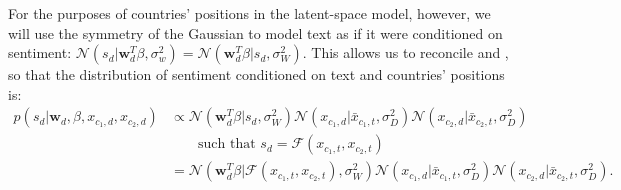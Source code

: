 For the purposes of countries' positions in the latent-space model,
however, we will use the symmetry of the Gaussian to model text as if
it were conditioned on sentiment: $\mathcal{N}(s_d | \bm w_d^T \beta,
\sigma_w^2) = \mathcal{N}( \bm w_d^T \beta | s_d, \sigma_W^2 )$.  This
allows us to reconcile  and
, so that the distribution of sentiment
conditioned on text and countries' positions is:
\begin{align}
  p(s_d | \bm w_d, \beta, x_{c_1,d}, x_{c_2,d}) & \propto
  \mathcal{N}(\bm w_d^T \beta | s_d, \sigma_W^2 )
  \mathcal{N}(x_{c_1,d} | \bar x_{c_1, t}, \sigma_D^2)
  \mathcal{N}(x_{c_2,d} | \bar x_{c_2, t}, \sigma_D^2) \\
  & \hspace{20pt} \mbox{ such that } s_d = \mathcal{F}(x_{c_1,t},
  x_{c_2,t})
  \\
  & = 
  \mathcal{N}(\bm w_d^T \beta |
    \mathcal{F}(x_{c_1,t}, x_{c_2,t}), \sigma_W^2 )
  \mathcal{N}(x_{c_1,d} | \bar x_{c_1, t}, \sigma_D^2)
  \mathcal{N}(x_{c_2,d} | \bar x_{c_2, t}, \sigma_D^2).
\end{align}



